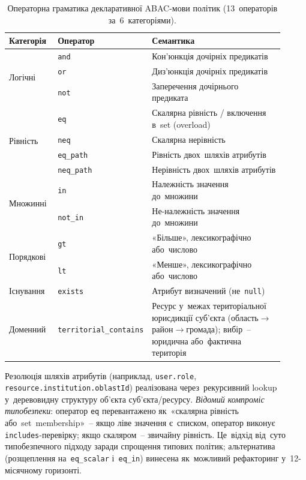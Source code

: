 \begin{table}[htbp]
\centering
\caption{Операторна граматика декларативної ABAC-мови політик (13~операторів за~6~категоріями).}
\label{tab:abac_grammar}
\footnotesize
\setlength\tabcolsep{4pt}
\renewcommand{\arraystretch}{1.15}
\begin{tabular}{|p{0.18\linewidth}|p{0.18\linewidth}|p{0.55\linewidth}|}
\hline
\textbf{Категорія} & \textbf{Оператор} & \textbf{Семантика} \\
\hline
\multirow{3}{*}{Логічні} & \texttt{and} & Кон'юнкція дочірніх предикатів \\
\cline{2-3}
& \texttt{or} & Диз'юнкція дочірніх предикатів \\
\cline{2-3}
& \texttt{not} & Заперечення дочірнього предиката \\
\hline
\multirow{4}{*}{Рівність} & \texttt{eq} & Скалярна рівність / включення в~set (overload) \\
\cline{2-3}
& \texttt{neq} & Скалярна нерівність \\
\cline{2-3}
& \texttt{eq\_path} & Рівність двох~шляхів атрибутів \\
\cline{2-3}
& \texttt{neq\_path} & Нерівність двох~шляхів атрибутів \\
\hline
\multirow{2}{*}{Множинні} & \texttt{in} & Належність значення до~множини \\
\cline{2-3}
& \texttt{not\_in} & Не-належність значення до~множини \\
\hline
\multirow{2}{*}{Порядкові} & \texttt{gt} & «Більше», лексикографічно або~числово \\
\cline{2-3}
& \texttt{lt} & «Менше», лексикографічно або~числово \\
\hline
Існування & \texttt{exists} & Атрибут визначений (не~\texttt{null}) \\
\hline
Доменний & \texttt{territorial\_contains} & Ресурс у~межах територіальної юрисдикції суб'єкта (область$\to$район$\to$громада); вибір~-- юридична або~фактична територія \\
\hline
\end{tabular}
\end{table}

Резолюція шляхів атрибутів (наприклад, \texttt{user.role}, \texttt{resource.institution.oblastId}) реалізована через~рекурсивний lookup у~деревовидну структуру об'єкта суб'єкта/ресурсу. \emph{Відомий компроміс типобезпеки}: оператор \texttt{eq} перевантажено як~«скалярна рівність або~set~membership»~-- якщо ліве значення є~списком, оператор виконує \texttt{includes}-перевірку; якщо скаляром~-- звичайну рівність. Це~відхід від~суто типобезпечного підходу заради спрощення типових політик; альтернатива (розщеплення на~\texttt{eq\_scalar} і~\texttt{eq\_in}) винесена як~можливий рефакторинг у~12-місячному горизонті.

